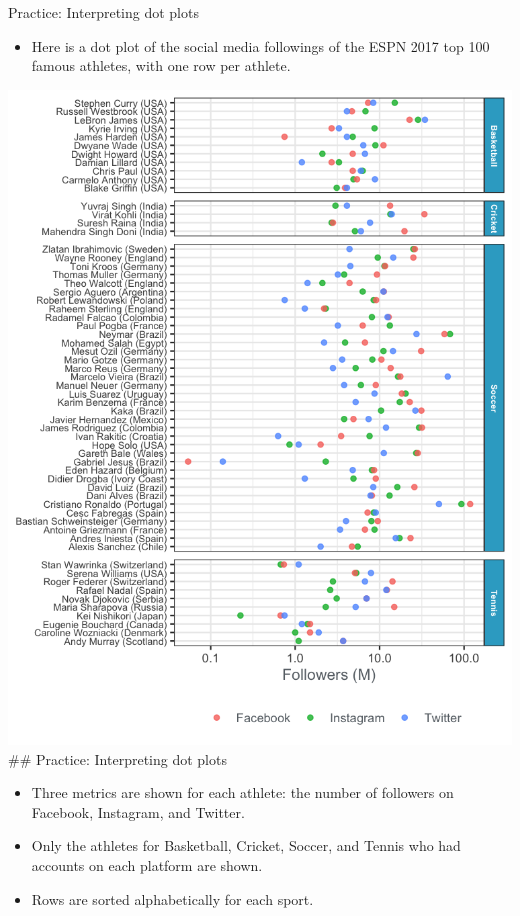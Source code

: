 \documentclass[
  ignorenonframetext,
]{beamer}
\providecommand{\tightlist}{%
  \setlength{\itemsep}{0pt}\setlength{\parskip}{0pt}}
\begin{document}
\begin{frame}{Practice: Interpreting dot plots}
\label{practice-interpreting-dot-plots-1}
\begin{itemize}
\tightlist
\item
  Here is a dot plot of the social media followings of the ESPN 2017 top
  100 famous athletes, with one row per athlete.
\end{itemize}

\includegraphics{../images/im63.png}\\
\#\# Practice: Interpreting dot plots

\begin{itemize}
\item
  Three metrics are shown for each athlete: the number of followers on
  Facebook, Instagram, and Twitter.
\item
  Only the athletes for Basketball, Cricket, Soccer, and Tennis who had
  accounts on each platform are shown.
\item
  Rows are sorted alphabetically for each sport.
\end{itemize}
\end{frame}
\end{document}
